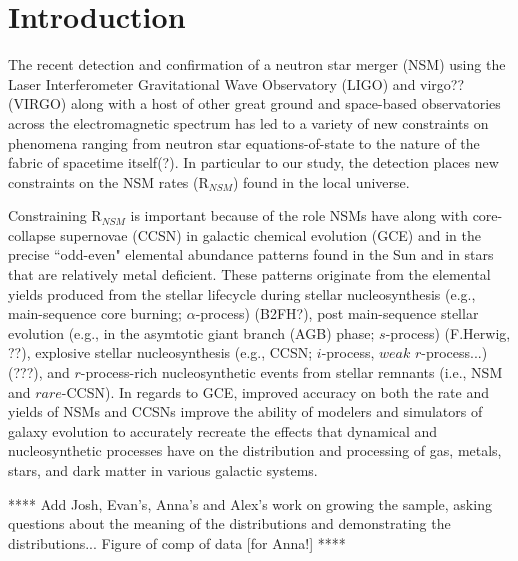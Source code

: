 \section{Introduction}
\label{intro} 
The recent detection and confirmation of a neutron star merger (NSM) using the Laser Interferometer Gravitational Wave Observatory (LIGO) and virgo?? (VIRGO) along with a host of other great ground and space-based observatories across the electromagnetic spectrum has led to a variety of new constraints on phenomena ranging from neutron star equations-of-state to the nature of the fabric of spacetime itself(?). In particular to our study, the detection places new constraints on the NSM rates (R$_{NSM}$) found in the local universe. 

Constraining R$_{NSM}$ is important because of the role NSMs have along with core-collapse supernovae (CCSN) in galactic chemical evolution (GCE) and in the precise ``odd-even" elemental abundance patterns found in the Sun and in stars that are relatively metal deficient. These patterns originate from the elemental yields produced from the stellar lifecycle during stellar nucleosynthesis (e.g., main-sequence core burning; $\alpha$-process) (B2FH?), post main-sequence stellar evolution (e.g., in the asymtotic giant branch (AGB) phase; $s$-process) (F.Herwig, ??), explosive stellar nucleosynthesis (e.g., CCSN; $i$-process, $weak$ $r$-process...) (???), and $r$-process-rich nucleosynthetic events from stellar remnants (i.e., NSM and $rare$-CCSN). In regards to GCE, improved accuracy on both the rate and yields of NSMs and CCSNs improve the ability of modelers and simulators of galaxy evolution to accurately recreate the effects that dynamical and nucleosynthetic processes have on the distribution and processing of gas, metals, stars, and dark matter in various galactic systems.

****
Add Josh, Evan's, Anna's and Alex's work on growing the sample, asking questions about the meaning of the distributions and demonstrating the distributions... Figure of comp of data [for Anna!]
****

